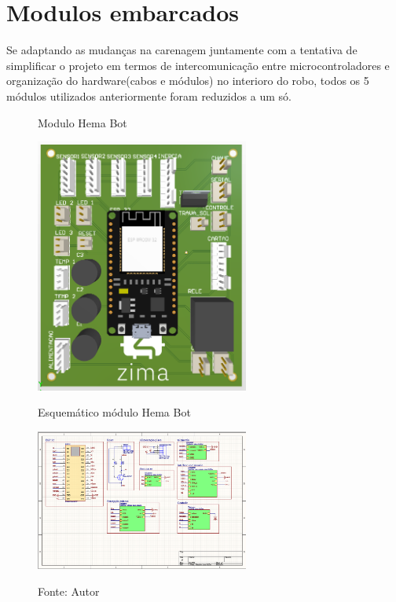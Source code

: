 \documentclass[../poliXuniversity_hospital_(USP)_report.tex]{subfiles}
\begin{document}
\section{Modulos embarcados}
Se adaptando as mudanças na carenagem juntamente com a tentativa de simplificar o projeto em termos de intercomunicação entre microcontroladores e organização do hardware(cabos e módulos) no interioro do robo, todos os 5 módulos utilizados anteriormente foram reduzidos a um só.

\begin{figure}[h]
\centering

    \begin{minipage}{0.5\textwidth}
        \centering
        
        \caption{Modulo Hema Bot}
        \centering %
        \includegraphics[width=7cm]{images/placa_hema.png}
        \label{figura: Módulo Hmea Bot}
    \end{minipage}\hfill
    \begin{minipage}{0.5\textwidth}
        \centering
        \caption{Esquemático módulo Hema Bot}
        \centering %
        \includegraphics[width=7cm]{images/esquematico_hema.png}
        \label{figura: Esquemático modulo Hema Bot}

    \end{minipage}\hfill
    \caption*{Fonte: Autor}
        
\end{figure}
\end{document}
